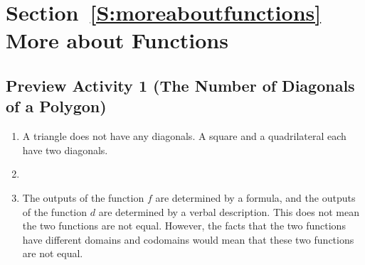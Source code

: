 \section*{Section~\ref{S:moreaboutfunctions} More about Functions}

\subsection*{Preview Activity 1 (The Number of Diagonals of a Polygon)}
\begin{enumerate}
\item A triangle does not have any diagonals.  A square and a quadrilateral each have two diagonals.

\item {}

\item The outputs of the function  $f$  are determined  by a formula, and the outputs of the function  $d$  are determined by a verbal description. This does not mean the two functions are not equal.  However, the facts that the two functions have different domains and codomains would mean that these two functions are not equal.
\end{enumerate}
\hbreak



